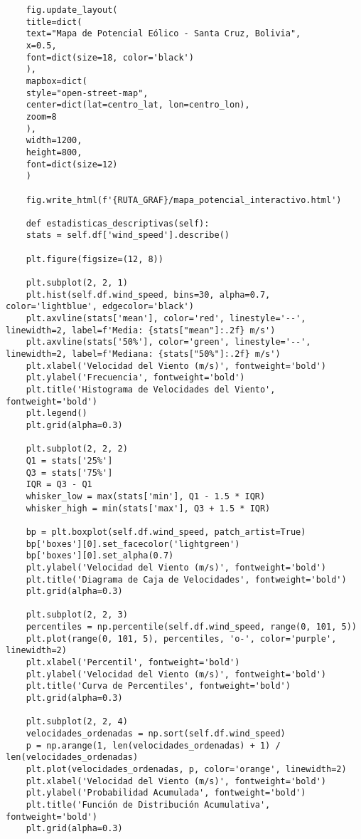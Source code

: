 \begin{lstlisting}
	fig.update_layout(
	title=dict(
	text="Mapa de Potencial Eólico - Santa Cruz, Bolivia",
	x=0.5,
	font=dict(size=18, color='black')
	),
	mapbox=dict(
	style="open-street-map",
	center=dict(lat=centro_lat, lon=centro_lon),
	zoom=8
	),
	width=1200,
	height=800,
	font=dict(size=12)
	)
	
	fig.write_html(f'{RUTA_GRAF}/mapa_potencial_interactivo.html')
	
	def estadisticas_descriptivas(self):
	stats = self.df['wind_speed'].describe()
	
	plt.figure(figsize=(12, 8))
	
	plt.subplot(2, 2, 1)
	plt.hist(self.df.wind_speed, bins=30, alpha=0.7, color='lightblue', edgecolor='black')
	plt.axvline(stats['mean'], color='red', linestyle='--', linewidth=2, label=f'Media: {stats["mean"]:.2f} m/s')
	plt.axvline(stats['50%'], color='green', linestyle='--', linewidth=2, label=f'Mediana: {stats["50%"]:.2f} m/s')
	plt.xlabel('Velocidad del Viento (m/s)', fontweight='bold')
	plt.ylabel('Frecuencia', fontweight='bold')
	plt.title('Histograma de Velocidades del Viento', fontweight='bold')
	plt.legend()
	plt.grid(alpha=0.3)
	
	plt.subplot(2, 2, 2)
	Q1 = stats['25%']
	Q3 = stats['75%']
	IQR = Q3 - Q1
	whisker_low = max(stats['min'], Q1 - 1.5 * IQR)
	whisker_high = min(stats['max'], Q3 + 1.5 * IQR)
	
	bp = plt.boxplot(self.df.wind_speed, patch_artist=True)
	bp['boxes'][0].set_facecolor('lightgreen')
	bp['boxes'][0].set_alpha(0.7)
	plt.ylabel('Velocidad del Viento (m/s)', fontweight='bold')
	plt.title('Diagrama de Caja de Velocidades', fontweight='bold')
	plt.grid(alpha=0.3)
	
	plt.subplot(2, 2, 3)
	percentiles = np.percentile(self.df.wind_speed, range(0, 101, 5))
	plt.plot(range(0, 101, 5), percentiles, 'o-', color='purple', linewidth=2)
	plt.xlabel('Percentil', fontweight='bold')
	plt.ylabel('Velocidad del Viento (m/s)', fontweight='bold')
	plt.title('Curva de Percentiles', fontweight='bold')
	plt.grid(alpha=0.3)
	
	plt.subplot(2, 2, 4)
	velocidades_ordenadas = np.sort(self.df.wind_speed)
	p = np.arange(1, len(velocidades_ordenadas) + 1) / len(velocidades_ordenadas)
	plt.plot(velocidades_ordenadas, p, color='orange', linewidth=2)
	plt.xlabel('Velocidad del Viento (m/s)', fontweight='bold')
	plt.ylabel('Probabilidad Acumulada', fontweight='bold')
	plt.title('Función de Distribución Acumulativa', fontweight='bold')
	plt.grid(alpha=0.3)
	

\end{lstlisting}
